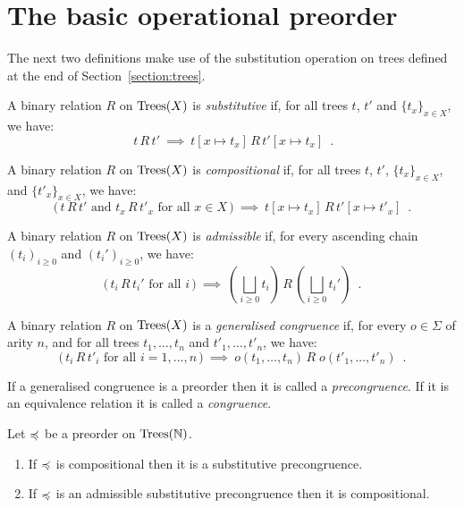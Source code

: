 \section{The basic operational preorder}


The next two definitions make use of the substitution operation on trees defined at the end of
Section~\ref{section:trees}.
\begin{adefinition}[Substitutive]
    A binary relation $R$ on $\textnormal{Trees}(X)$ is  \emph{substitutive} if,
    for all trees $t$, $t'$ and $\{t_x\}_{x \in X}$, we have:
    \[ \text{$\,t\, R \, t'$} ~ \implies ~ 
       t[ x \mapsto t_x] \, R \, t'[ x \mapsto t_x] \enspace .
    \]
\end{adefinition}



\begin{adefinition}[Compositionality]
    A binary relation $R$ on $\textnormal{Trees}(X)$ is \emph{compositional} if, for all 
    trees $t$, $t'$,  $\{t_x\}_{x \in X}$,  and $\{t'_x\}_{x \in X}$, we have:
        \[ \text{($\,t \, R \, t'$ and $t_x \, R \, t'_x$ for all $x \in X\,$)} ~ \implies ~ 
        t[ x \mapsto t_x] \, R \, t'[ x \mapsto t'_x] \enspace .
    \]
\end{adefinition}

\begin{adefinition}[Admissibility]
    A binary relation $R$ on $\textnormal{Trees}(X)$ is \emph{admissible} if,
    for every ascending chain $(t_i)_{i \geq 0}$ and 
    $(t_i')_{i\geq 0}$, we have:
    \[ \text{($\,t_i \, R \, t_i'$ for all $i\,$)} ~ \implies~
        \left(\bigsqcup_{i \geq 0} t_i\right) \, R \, \left(\bigsqcup_{i \geq 0} t_i'\right) \enspace .
    \]
\end{adefinition}

\begin{adefinition}
    A binary relation $R$ on $\textnormal{Trees}(X)$ is a \emph{generalised congruence} if,
    for every $o \in \Sigma$ of arity $n$, and for all trees 
     $t_1,\dots, t_n$ and $t'_1, \dots, t'_n$, we have:
    \[ \text{($\,t_i\, R \, t'_i$ for all $i = 1, \dots, n\,$)} ~ \implies ~ 
        o(t_1, \dots, t_n) \, R \; o(t'_1, \dots, t'_n) \enspace .
    \]
\end{adefinition}

If a generalised congruence is a preorder then it is called a \emph{precongruence}. 
If it is an equivalence relation it is called a \emph{congruence}.


\begin{aproposition} Let $\preccurlyeq$ be a preorder  on $\textnormal{Trees}(\mathbb{N})$.
\begin{enumerate} 
\item If  $\preccurlyeq$ is compositional then it is a substitutive precongruence.
\item If $\preccurlyeq$ is an admissible substitutive precongruence then it is compositional.
\end{enumerate}
\end{aproposition}

